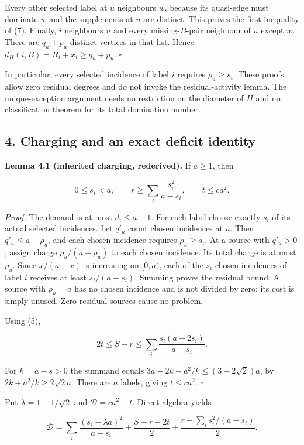 \documentclass[
  11pt,
  a4paper,
]{article}
\begin{document}
Every other selected label at \(u\) neighbours \(w\), because its
quasi-edge must dominate \(w\) and the supplements at \(u\) are
distinct. This proves the first inequality of (7). Finally, \(i\)
neighbours \(u\) and every missing-\(B\)-pair neighbour of \(u\) except
\(w\). There are \(q_u+p_u\) distinct vertices in that list. Hence
\(d_H(i,B)=R_i+x_i\ge q_u+p_u\). \(\square\)

In particular, every selected incidence of label \(i\) requires
\(\rho_u\ge s_i\). These proofs allow zero residual degrees and do not
invoke the residual-activity lemma. The unique-exception argument needs
no restriction on the diameter of \(H\) and no classification theorem
for its total domination number.

\subsection{4. Charging and an exact deficit
identity}\label{charging-and-an-exact-deficit-identity}

\textbf{Lemma 4.1 (inherited charging, rederived).} If \(a\ge1\), then

\[0\le s_i<a,\qquad r\ge\sum_i\frac{s_i^2}{a-s_i},\qquad t\le ca^2. \tag{8}\]

\emph{Proof.} The demand is at most \(d_i\le a-1\). For each label
choose exactly \(s_i\) of its actual selected incidences. Let \(q'_u\)
count chosen incidences at \(u\). Then \(q'_u\le a-\rho_u\), and each
chosen incidence requires \(\rho_u\ge s_i\). At a source with
\(q'_u>0\), assign charge \(\rho_u/(a-\rho_u)\) to each chosen
incidence. Its total charge is at most \(\rho_u\). Since \(x/(a-x)\) is
increasing on \([0,a)\), each of the \(s_i\) chosen incidences of label
\(i\) receives at least \(s_i/(a-s_i)\). Summing proves the residual
bound. A source with \(\rho_u=a\) has no chosen incidence and is not
divided by zero; its cost is simply unused. Zero-residual sources cause
no problem.

Using (5),

\[2t\le S-r\le\sum_i\frac{s_i(a-2s_i)}{a-s_i}.\]

For \(k=a-s>0\) the summand equals \(3a-2k-a^2/k\le(3-2\sqrt2)a\), by
\(2k+a^2/k\ge2\sqrt2a\). There are \(a\) labels, giving \(t\le ca^2\).
\(\square\)

Put \(\lambda=1-1/\sqrt2\) and \(\mathcal D=ca^2-t\). Direct algebra
yields

\[\boxed{\mathcal D=\sum_i\frac{(s_i-\lambda a)^2}{a-s_i}+\frac{S-r-2t}{2}+\frac{r-\sum_i s_i^2/(a-s_i)}2.} \tag{9}\]
\end{document}
